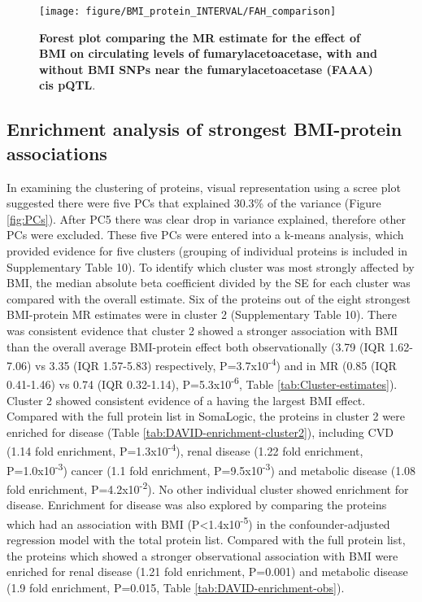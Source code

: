 \documentclass[11pt,twoside]{bristolthesis}
\begin{document}
\begin{figure}

{\centering \texttt{[image: figure/BMI\_protein\_INTERVAL/FAH\_comparison]} 

}

\caption[Forest plot comparing the MR estimate for the effect of BMI on circulating levels of fumarylacetoacetase (FAAA), with and without BMI SNPs near the fumarylacetoacetase cis pQTL]{\textbf{Forest plot comparing the MR estimate for the effect of BMI on circulating levels of fumarylacetoacetase, with and without BMI SNPs near the fumarylacetoacetase (FAAA) cis pQTL}.}\label{fig:FAA-forest}
\end{figure}
\hypertarget{enrichment-analysis-of-strongest-bmi-protein-associations}{%
\subsection{Enrichment analysis of strongest BMI-protein associations}\label{enrichment-analysis-of-strongest-bmi-protein-associations}}

In examining the clustering of proteins, visual representation using a scree plot suggested there were five PCs that explained 30.3\% of the variance (Figure \ref{fig:PCs}). After PC5 there was clear drop in variance explained, therefore other PCs were excluded. These five PCs were entered into a k-means analysis, which provided evidence for five clusters (grouping of individual proteins is included in Supplementary Table 10). To identify which cluster was most strongly affected by BMI, the median absolute beta coefficient divided by the SE for each cluster was compared with the overall estimate. Six of the proteins out of the eight strongest BMI-protein MR estimates were in cluster 2 (Supplementary Table 10). There was consistent evidence that cluster 2 showed a stronger association with BMI than the overall average BMI-protein effect both observationally (3.79 (IQR 1.62-7.06) vs 3.35 (IQR 1.57-5.83) respectively, P=3.7x10\textsuperscript{-4}) and in MR (0.85 (IQR 0.41-1.46) vs 0.74 (IQR 0.32-1.14), P=5.3x10\textsuperscript{-6}, Table \ref{tab:Cluster-estimates}). Cluster 2 showed consistent evidence of a having the largest BMI effect. Compared with the full protein list in SomaLogic, the proteins in cluster 2 were enriched for disease (Table \ref{tab:DAVID-enrichment-cluster2}), including CVD (1.14 fold enrichment, P=1.3x10\textsuperscript{-4}), renal disease (1.22 fold enrichment, P=1.0x10\textsuperscript{-3}) cancer (1.1 fold enrichment, P=9.5x10\textsuperscript{-3}) and metabolic disease (1.08 fold enrichment, P=4.2x10\textsuperscript{-2}). No other individual cluster showed enrichment for disease. Enrichment for disease was also explored by comparing the proteins which had an association with BMI (P\textless1.4x10\textsuperscript{-5}) in the confounder-adjusted regression model with the total protein list. Compared with the full protein list, the proteins which showed a stronger observational association with BMI were enriched for renal disease (1.21 fold enrichment, P=0.001) and metabolic disease (1.9 fold enrichment, P=0.015, Table \ref{tab:DAVID-enrichment-obs}).
\end{document}
